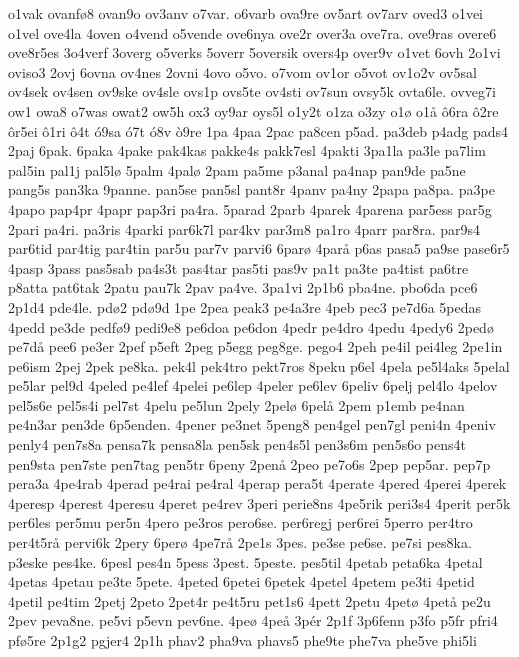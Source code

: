 {o1vak
ovanf^^f88
ovan9o
ov3anv
o7var.
o6varb
ova9re
ov5art
ov7arv
oved3
o1vei
o1vel
ove4la
4oven
o4vend
o5vende
ove6nya
ove2r
over3a
ove7ra.
ove9ras
overe6
ove8r5es
3o4verf
3overg
o5verks
5overr
5oversik
overs4p
over9v
o1vet
6ovh
2o1vi
oviso3
2ovj
6ovna
ov4nes
2ovni
4ovo
o5vo.
o7vom
ov1or
o5vot
ov1o2v
ov5sal
ov4sek
ov4sen
ov9ske
ov4sle
ovs1p
ovs5te
ov4sti
ov7sun
ovsy5k
ovta6le.
ovveg7i
ow1
owa8
o7was
owat2
ow5h
ox3
oy9ar
oys5l
o1y2t
o1za
o3zy
o1^^f8
o1^^e5
^^f46ra
^^f42re
^^f4r5ei
^^f41ri
^^f44t
^^f39sa
^^f37t
^^f38v
^^f29re
1pa
4paa
2pac
pa8cen
p5ad.
pa3deb
p4adg
pads4
2paj
6pak.
6paka
4pake
pak4kas
pakke4s
pakk7esl
4pakti
3pa1la
pa3le
pa7lim
pal5in
pal1j
pal5l^^f8
5palm
4pal^^f8
2pam
pa5me
p3anal
pa4nap
pan9de
pa5ne
pang5s
pan3ka
9panne.
pan5se
pan5sl
pant8r
4panv
pa4ny
2papa
pa8pa.
pa3pe
4papo
pap4pr
4papr
pap3ri
pa4ra.
5parad
2parb
4parek
4parena
par5ess
par5g
2pari
pa4ri.
pa3ris
4parki
par6k7l
par4kv
par3m8
pa1ro
4parr
par8ra.
par9s4
par6tid
par4tig
par4tin
par5u
par7v
parvi6
6par^^f8
4par^^e5
p6as
pasa5
pa9se
pase6r5
4pasp
3pass
pas5sab
pa4s3t
pas4tar
pas5ti
pas9v
pa1t
pa3te
pa4tist
pa6tre
p8atta
pat6tak
2patu
pau7k
2pav
pa4ve.
3pa1vi
2p1b6
pba4ne.
pbo6da
pce6
2p1d4
pde4le.
pd^^f82
pd^^f89d
1pe
2pea
peak3
pe4a3re
4peb
pec3
pe7d6a
5pedas
4pedd
pe3de
pedf^^f89
pedi9e8
pe6doa
pe6don
4pedr
pe4dro
4pedu
4pedy6
2ped^^f8
pe7d^^e5
pee6
pe3er
2pef
p5eft
2peg
p5egg
peg8ge.
pego4
2peh
pe4il
pei4leg
2pe1in
pe6ism
2pej
2pek
pe8ka.
pek4l
pek4tro
pekt7ros
8peku
p6el
4pela
pe5l4aks
5pelal
pe5lar
pel9d
4peled
pe4lef
4pelei
pe6lep
4peler
pe6lev
6peliv
6pelj
pel4lo
4pelov
pel5s6e
pel5s4i
pel7st
4pelu
pe5lun
2pely
2pel^^f8
6pel^^e5
2pem
p1emb
pe4nan
pe4n3ar
pen3de
6p5enden.
4pener
pe3net
5peng8
pen4gel
pen7gl
peni4n
4peniv
penly4
pen7s8a
pensa7k
pensa8la
pen5sk
pen4s5l
pen3s6m
pen5s6o
pens4t
pen9sta
pen7ste
pen7tag
pen5tr
6peny
2pen^^e5
2peo
pe7o6s
2pep
pep5ar.
pep7p
pera3a
4pe4rab
4perad
pe4rai
pe4ral
4perap
pera5t
4perate
4pered
4perei
4perek
4peresp
4perest
4peresu
4peret
pe4rev
3peri
perie8ns
4pe5rik
peri3s4
4perit
per5k
per6les
per5mu
per5n
4pero
pe3ros
pero6se.
per6regj
per6rei
5perro
per4tro
per4t5r^^e5
pervi6k
2pery
6per^^f8
4pe7r^^e5
2pe1s
3pes.
pe3se
pe6se.
pe7si
pes8ka.
p3eske
pes4ke.
6pesl
pes4n
5pess
3pest.
5peste.
pes5til
4petab
peta6ka
4petal
4petas
4petau
pe3te
5pete.
4peted
6petei
6petek
4petel
4petem
pe3ti
4petid
4petil
pe4tim
2petj
2peto
2pet4r
pe4t5ru
pet1s6
4pett
2petu
4pet^^f8
4pet^^e5
pe2u
2pev
peva8ne.
pe5vi
p5evn
pev6ne.
4pe^^f8
4pe^^e5
3p^^e9r
2p1f
3p6fenn
p3fo
p5fr
pfri4
pf^^f85re
2p1g2
pgjer4
2p1h
phav2
pha9va
phavs5
phe9te
phe7va
phe5ve
phi5li
}

